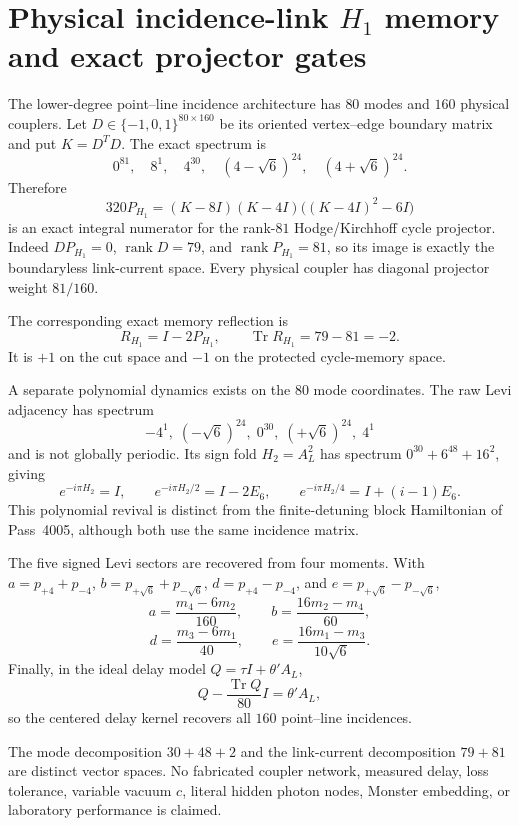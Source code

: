 \section{Physical incidence-link $H_1$ memory and exact projector gates}
\label{sec:bt4013-4018}

The lower-degree point--line incidence architecture has $80$ modes and $160$
physical couplers.  Let $D\in\{-1,0,1\}^{80\times160}$ be its oriented
vertex--edge boundary matrix and put $K=D^TD$.  The exact spectrum is
\[
0^{81},\quad 8^1,\quad4^{30},\quad
(4-\sqrt6)^{24},\quad(4+\sqrt6)^{24}.
\]
Therefore
\[
\boxed{
320P_{H_1}=(K-8I)(K-4I)\bigl((K-4I)^2-6I\bigr)
}
\]
is an exact integral numerator for the rank-$81$ Hodge/Kirchhoff cycle
projector.  Indeed $DP_{H_1}=0$, $\operatorname{rank}D=79$, and
$\operatorname{rank}P_{H_1}=81$, so its image is exactly the boundaryless
link-current space.  Every physical coupler has diagonal projector weight
$81/160$.

The corresponding exact memory reflection is
\[
\boxed{R_{H_1}=I-2P_{H_1}},
\qquad
\operatorname{Tr}R_{H_1}=79-81=-2.
\]
It is $+1$ on the cut space and $-1$ on the protected cycle-memory space.

A separate polynomial dynamics exists on the $80$ mode coordinates.  The raw
Levi adjacency has spectrum
\[
-4^1,\;(-\sqrt6)^{24},\;0^{30},\;(+\sqrt6)^{24},\;4^1
\]
and is not globally periodic.  Its sign fold $H_2=A_L^2$ has spectrum
$0^{30}+6^{48}+16^2$, giving
\[
e^{-i\pi H_2}=I,
\qquad
e^{-i\pi H_2/2}=I-2E_6,
\qquad
e^{-i\pi H_2/4}=I+(i-1)E_6.
\]
This polynomial revival is distinct from the finite-detuning block Hamiltonian
of Pass~4005, although both use the same incidence matrix.

The five signed Levi sectors are recovered from four moments.  With
$a=p_{+4}+p_{-4}$, $b=p_{+\sqrt6}+p_{-\sqrt6}$,
$d=p_{+4}-p_{-4}$, and $e=p_{+\sqrt6}-p_{-\sqrt6}$,
\[
a=\frac{m_4-6m_2}{160},\qquad
b=\frac{16m_2-m_4}{60},
\]
\[
d=\frac{m_3-6m_1}{40},\qquad
e=\frac{16m_1-m_3}{10\sqrt6}.
\]
Finally, in the ideal delay model $Q=\tau I+\theta'A_L$,
\[
\boxed{Q-\frac{\operatorname{Tr}Q}{80}I=\theta'A_L},
\]
so the centered delay kernel recovers all $160$ point--line incidences.

The mode decomposition $30+48+2$ and the link-current decomposition $79+81$
are distinct vector spaces.  No fabricated coupler network, measured delay,
loss tolerance, variable vacuum $c$, literal hidden photon nodes, Monster
embedding, or laboratory performance is claimed.
